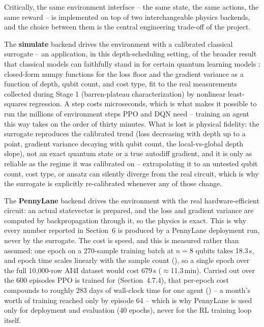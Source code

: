 Critically, the same environment interface -- the same state, the same actions, the same reward -- is implemented on top of two interchangeable physics backends, and the choice between them is the central engineering trade-off of the project.

The \textbf{simulate} backend drives the environment with a calibrated classical surrogate -- an application, in this depth-scheduling setting, of the broader result that classical models can faithfully stand in for certain quantum learning models \citep{schreiber2023classical}: closed-form numpy functions for the loss floor and the gradient variance as a function of depth, qubit count, and cost type, fit to the real measurements collected during Stage 1 (barren-plateau characterization) by nonlinear least-squares regression. A step costs microseconds, which is what makes it possible to run the millions of environment steps PPO and DQN need -- training an agent this way takes on the order of thirty minutes. What is lost is physical fidelity: the surrogate reproduces the calibrated trend (loss decreasing with depth up to a point, gradient variance decaying with qubit count, the local-vs-global depth slope), not an exact quantum state or a true autodiff gradient, and it is only as reliable as the regime it was calibrated on -- extrapolating it to an untested qubit count, cost type, or ansatz can silently diverge from the real circuit, which is why the surrogate is explicitly re-calibrated whenever any of those change.

The \textbf{PennyLane} backend \citep{bergholm2018pennylane} drives the environment with the real hardware-efficient circuit: an actual statevector is prepared, and the loss and gradient variance are computed by backpropagation through it, so the physics is exact. This is why every number reported in Section~6 is produced by a PennyLane deployment run, never by the surrogate. The cost is speed, and this is measured rather than assumed: one epoch on a 270-sample training batch at $n=8$ qubits takes 18.3\,s, and epoch time scales linearly with the sample count (), so a single epoch over the full 10,000-row AI4I dataset would cost 679\,s ($\approx$11.3\,min). Carried out over the 600 episodes PPO is trained for (Section~4.7.4), that per-epoch cost compounds to roughly 283 days of wall-clock time for one agent () -- a month's worth of training reached only by episode 64 -- which is why PennyLane is used only for deployment and evaluation (40 epochs), never for the RL training loop itself.

